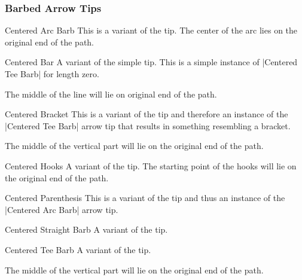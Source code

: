 \begin{multicols}{2}
\subsubsection{Barbed Arrow Tips}
\begin{arrowtipsimple}{Centered Arc Barb}
    This is a variant of the  tip.
    The center of the arc lies on the original end of the path.
\end{arrowtipsimple}

\begin{arrowtipsimple}{Centered Bar}
    A variant of the simple  tip.
    This is a simple instance of |Centered Tee Barb| for length zero.
    
    The middle of the line will lie on original end of the path.
\end{arrowtipsimple}

\begin{arrowtipsimple}{Centered Bracket}
    This is a variant of the  tip and
    therefore an instance of the |Centered Tee Barb| arrow tip that results in something
    resembling a bracket.
    
    The middle of the vertical part will lie on the original end of the path.
\end{arrowtipsimple}

\begin{arrowtipsimple}{Centered Hooks}
    A variant of the  tip.
    The starting point of the hooks will lie on the original end of the path.
\end{arrowtipsimple}

\begin{arrowtipsimple}{Centered Parenthesis}
    This is a variant of the  tip and
    thus an instance of the |Centered Arc Barb| arrow tip.
\end{arrowtipsimple}

\begin{arrowtipsimple}{Centered Straight Barb}
    A variant of the  tip.
\end{arrowtipsimple}

\begin{arrowtipsimple}{Centered Tee Barb}
    A variant of the  tip.
    
    The middle of the vertical part will lie on the original end of the path.
\end{arrowtipsimple}


\end{multicols}

